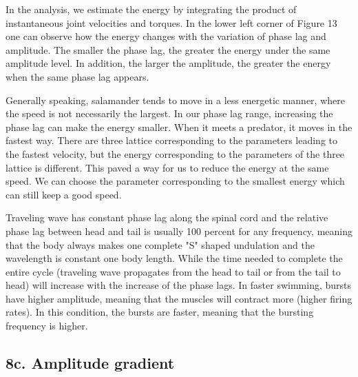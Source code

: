 \documentclass{cmc}
\begin{document}
In the analysis,  we estimate the energy by integrating the product of instantaneous joint velocities and torques.
In the lower left corner of Figure 13 one can observe how the energy changes with the variation of phase lag and amplitude. The smaller the phase lag, the greater the energy under the same amplitude level. In addition, the larger the amplitude, the greater the energy when the same phase lag appears.

Generally speaking, salamander tends to move in a less energetic manner, where the speed is not necessarily the largest. In our phase lag range, increasing the phase lag can make the energy smaller. When it meets a predator, it moves in the fastest way.  There are three lattice corresponding to the parameters leading to the fastest velocity, but the energy corresponding to the parameters of the three lattice is different. This paved a way for us to reduce the energy at the same speed. We can choose the parameter corresponding to the smallest energy which can still keep a good speed.


Traveling wave has constant phase lag along the spinal cord and the relative phase lag between head and tail is usually 100 percent for any frequency, meaning that the body always makes one complete "S" shaped undulation and the wavelength is constant one body length. While the time needed to complete the entire cycle (traveling wave propagates from the head to tail or from the tail to head) will increase with the increase of the phase lags.
In faster swimming, bursts have higher amplitude, meaning that the muscles will contract more (higher firing rates). In this condition, the bursts are faster, meaning that the bursting frequency is higher. 





\subsection*{8c. Amplitude gradient}
\label{sec:amplitude-gradient}
\end{document}

